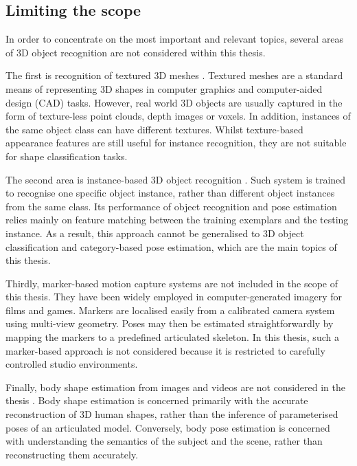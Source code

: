 \subsection{Limiting the scope}

In order to concentrate on the most important and relevant topics, several areas of 3D object recognition are not considered within this thesis. 

The first is recognition of textured 3D meshes \cite{Zaharescu2009, Bronstein2011, Kokkinos2012}. Textured meshes are a standard means of representing 3D shapes in computer graphics and computer-aided design (CAD) tasks. 
However, real world 3D objects are usually captured in the form of texture-less point clouds, depth images or voxels. 
In addition, instances of the same object class can have different textures. Whilst texture-based appearance features are still useful for instance recognition, they are not suitable for shape classification tasks.  

The second area is instance-based 3D object recognition \cite{Mian2006, Rothganger2006, Shang2010}. Such system is trained to recognise one specific object instance, rather than different object instances from the same class. Its performance of object recognition and pose estimation relies mainly on feature matching between the training exemplars and the testing instance. As a result, this approach cannot be generalised to 3D object classification and category-based pose estimation, which are the main topics of this thesis.    
   

Thirdly, marker-based motion capture systems are not included in the scope of this thesis. They have been widely employed in computer-generated imagery for films and games. Markers are localised easily from a calibrated camera system using multi-view geometry. Poses may then be estimated straightforwardly by mapping the markers to a predefined articulated skeleton. In this thesis, such a marker-based approach is not considered because it is restricted to carefully controlled studio environments.  
 
Finally, body shape estimation from images and videos are not considered in the thesis \cite{Guan2009, Rother2009, Chen2011}. 
Body shape estimation is concerned primarily with the accurate reconstruction of 3D human shapes, rather than the inference of parameterised poses of an articulated model. Conversely, body pose estimation is concerned with understanding the semantics of the subject and the scene, rather than reconstructing them accurately. 

